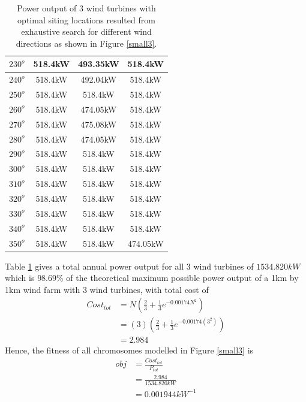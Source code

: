 \begin{table}[H]
\begin{tabular}{|c|c|c|c|}
                $230^o$ & 518.4kW & 493.35kW & 518.4kW \\ \hline
                $240^o$ & 518.4kW & 492.04kW & 518.4kW \\ \hline
                $250^o$ & 518.4kW & 518.4kW & 518.4kW \\ \hline
                $260^o$ & 518.4kW & 474.05kW & 518.4kW \\ \hline
                $270^o$ & 518.4kW & 475.08kW & 518.4kW \\ \hline
                $280^o$ & 518.4kW & 474.05kW & 518.4kW \\ \hline
                $290^o$ & 518.4kW & 518.4kW & 518.4kW \\ \hline
                $300^o$ & 518.4kW & 518.4kW & 518.4kW \\ \hline
                $310^o$ & 518.4kW & 518.4kW & 518.4kW \\ \hline
                $320^o$ & 518.4kW & 518.4kW & 518.4kW \\ \hline
                $330^o$ & 518.4kW & 518.4kW & 518.4kW \\ \hline
                $340^o$ & 518.4kW & 518.4kW & 518.4kW \\ \hline
                $350^o$ & 518.4kW & 518.4kW & 474.05kW \\ \hline
            \end{tabular}
            \caption{Power output of 3 wind turbines with optimal siting locations resulted from exhaustive search for different wind directions as shown in Figure \ref{small3}.}
            \label{table3}
        \end{table}
        \doublespacing
        
        Table \ref{table3} gives a total annual power output for all 3 wind turbines of $1534.820kW$ which is $98.69\%$ of the theoretical maximum possible power output of a 1km by 1km wind farm with 3 wind turbines, with total cost of
        \begin{align*}
            Cost_{tot}
            &= N\left(\frac{2}{3} + \frac{1}{3}e^{-0.00174N^2}\right) \\
            &= \left(3\right)\left(\frac{2}{3} + \frac{1}{3}e^{-0.00174\left(3^2\right)}\right) \\
            &= 2.984
        \end{align*}
        Hence, the fitness of all chromosomes modelled in Figure \ref{small3} is
        \begin{align*}
            obj
            &=\frac{Cost_{tot}}{P_{tot}} \\
            &=\frac{2.984}{1534.820kW} \\
            &=0.001944kW^{-1}
        \end{align*}
    
